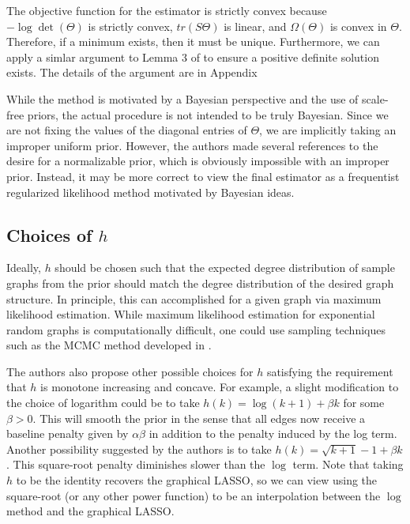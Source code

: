 \documentclass{uwstat572}
\theoremstyle{remark}
\theoremstyle{definition}
\begin{document}
The objective function for the estimator is strictly convex because $- \log \det(\Theta)$ is strictly convex, $tr(S \Theta)$ is linear, and $\Omega(\Theta)$ is convex in $\Theta$.  Therefore, if a minimum exists, then it must be unique.  Furthermore, we can apply a simlar argument to Lemma 3 of \cite{ravikumar2011} to ensure a positive definite solution exists. The details of the argument are in Appendix

While the method is motivated by a Bayesian perspective and the use of scale-free priors, the actual procedure is not intended to be truly Bayesian.  Since we are not fixing the values of the diagonal entries of $\Theta$, we are implicitly taking an improper uniform prior.  However, the authors made several references to the desire for a normalizable prior, which is obviously impossible with an improper prior.  Instead, it may be more correct to view the final estimator as a frequentist regularized likelihood method motivated by Bayesian ideas.



\subsection{Choices of $h$}

Ideally, $h$ should be chosen such that the expected degree distribution of sample graphs from the prior should match the degree distribution of the desired graph structure.  In principle, this can accomplished for a given graph via maximum likelihood estimation.  While maximum likelihood estimation for exponential random graphs is computationally difficult, one could use sampling techniques such as the MCMC method developed in \cite{snijders2002markov}.  

The authors also propose other possible choices for $h$ satisfying the requirement that $h$ is monotone increasing and concave.  For example, a slight modification to the choice of logarithm could be to take $h(k) = \log(k + 1) + \beta k$ for some $\beta > 0$.  This will smooth the prior in the sense that all edges now receive a baseline penalty given by $\alpha \beta$ in addition to the penalty induced by the log term.  Another possibility suggested by the authors is to take $h(k) = \sqrt{k+1} - 1 + \beta k$.
This square-root penalty diminishes slower than the $\log$ term.  Note that taking $h$ to be the identity recovers the graphical LASSO, so we can view using the square-root (or any other power function) to be an interpolation between the $\log$ method and the graphical LASSO.
\end{document}
